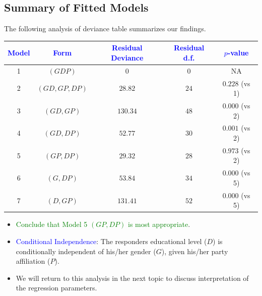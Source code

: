 \documentclass{article}\usepackage[]{graphicx}\usepackage[svgnames]{xcolor}
\begin{document}
\subsection*{Summary of Fitted Models}
The following analysis of deviance table summarizes our findings.
\begin{table}[H]
      \centering
      \begin{tabular}{ccccc}
            \toprule
            \textcolor{Blue}{Model} & \textcolor{Blue}{Form} & \textcolor{Blue}{Residual Deviance} & \textcolor{Blue}{Residual d.f.} & \textcolor{Blue}{$ p $-value} \\
            \midrule
            1                       & $ (GDP) $              & 0                                   & 0                               & NA                            \\
            \midrule
            2                       & $(GD, GP, DP)$         & $28.82$                             & $24$                            & $0.228$ (vs 1)                \\
            \midrule
            3                       & $(GD, GP)$             & $130.34$                            & $48$                            & $0.000$ (vs 2)                \\
            4                       & $(GD, DP)$             & $52.77$                             & $30$                            & $0.001$ (vs 2)                \\
            5                       & $(GP, DP)$             & $29.32$                             & $28$                            & $0.973$ (vs 2)                \\
            \midrule
            6                       & $(G, DP)$              & $53.84$                             & $34$                            & $0.000$ (vs 5)                \\
            7                       & $(D, GP)$              & $131.41$                            & $52$                            & $0.000$ (vs 5)                \\
            \bottomrule
      \end{tabular}
\end{table}
\begin{itemize}
      \item \textcolor{Green}{Conclude that Model 5 $(GP, DP)$ is most appropriate}.
      \item \textcolor{Blue}{Conditional Independence}: The responders educational level ($D$) is conditionally
            independent of his/her gender ($G$), given his/her party affiliation ($P$).
      \item We will return to this analysis in the next topic to discuss interpretation of the
            regression parameters.
\end{itemize}
\end{document}
